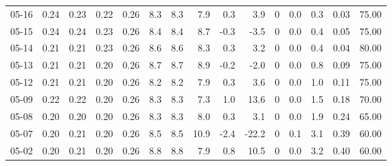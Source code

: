 \begin{threeparttable}
{\begin{tabular}{lrrrrrrrrrrrrrr}
  05-16 &          0.24 &          0.23 &          0.22 &        0.26 &                 8.3 &                8.3 &                 7.9 &        0.3 &          3.9 &              0 &                 0.0 &              0.3 &            0.03 &                  75.00 \\
  05-15 &          0.24 &          0.24 &          0.23 &        0.26 &                 8.4 &                8.4 &                 8.7 &       -0.3 &         -3.5 &              0 &                 0.0 &              0.4 &            0.05 &                  75.00 \\
  05-14 &          0.21 &          0.21 &          0.23 &        0.26 &                 8.6 &                8.6 &                 8.3 &        0.3 &          3.2 &              0 &                 0.0 &              0.4 &            0.04 &                  80.00 \\
  05-13 &          0.21 &          0.21 &          0.20 &        0.26 &                 8.7 &                8.7 &                 8.9 &       -0.2 &         -2.0 &              0 &                 0.0 &              0.8 &            0.09 &                  75.00 \\
  05-12 &          0.21 &          0.21 &          0.20 &        0.26 &                 8.2 &                8.2 &                 7.9 &        0.3 &          3.6 &              0 &                 0.0 &              1.0 &            0.11 &                  75.00 \\
  05-09 &          0.22 &          0.22 &          0.20 &        0.26 &                 8.3 &                8.3 &                 7.3 &        1.0 &         13.6 &              0 &                 0.0 &              1.5 &            0.18 &                  70.00 \\
  05-08 &          0.20 &          0.20 &          0.20 &        0.26 &                 8.3 &                8.3 &                 8.0 &        0.3 &          3.1 &              0 &                 0.0 &              1.9 &            0.24 &                  65.00 \\
  05-07 &          0.20 &          0.21 &          0.20 &        0.26 &                 8.5 &                8.5 &                10.9 &       -2.4 &        -22.2 &              0 &                 0.1 &              3.1 &            0.39 &                  60.00 \\
  05-02 &          0.20 &          0.21 &          0.20 &        0.26 &                 8.8 &                8.8 &                 7.9 &        0.8 &         10.5 &              0 &                 0.0 &              3.2 &            0.40 &                  60.00 \\

\end{tabular}}
\end{threeparttable}
